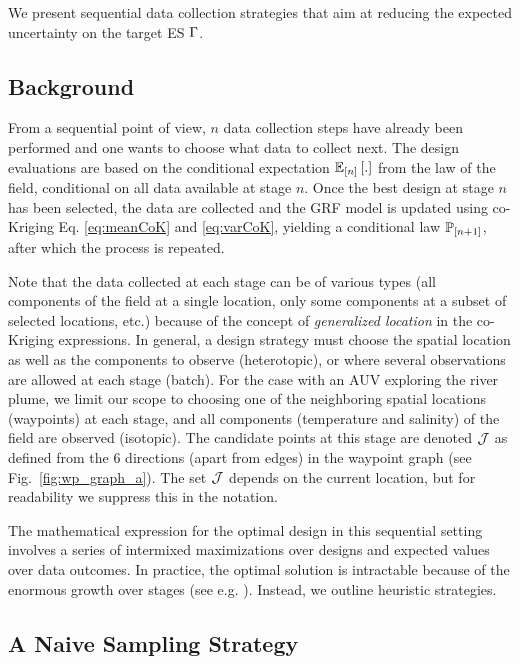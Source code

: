 \documentclass[aoas]{imsart}
\begin{document}
We present sequential data collection
strategies that aim at reducing the expected uncertainty on the target
ES $\Gamma$.

\subsection{Background}

From a sequential point of view, $n$ data collection steps have
already been performed and one wants to choose what data to collect
next. The design evaluations
are based on the conditional expectation $\mathbb{E}_{[n]} \left[.\right]$ from the law
of the field, conditional on all data available at
stage $n$.
Once the best design at stage $n$
has been selected, the data are collected and the GRF
model is updated using co-Kriging
Eq. \ref{eq:meanCoK} and \ref{eq:varCoK}, yielding a conditional law $\mathbb{P}_{[n+1]}$,
after which the process is repeated.

Note that the data collected at each stage can be of various
types (all components of the field at a single location, only some
components at a subset of selected locations, etc.) because of the
concept of \textit{generalized location} in the co-Kriging expressions.
In general, a design strategy must choose the spatial location as well
as the components to observe (heterotopic), or where several
observations are allowed at each stage (batch).  For the case with an
AUV exploring the river plume, we limit our scope to choosing one of
the neighboring spatial locations (waypoints) at each stage, and all
components (temperature and salinity) of the field are observed
(isotopic). The candidate points at this stage are denoted
$\mathcal{J}$ as defined from the 6 directions (apart from edges) in
the waypoint graph (see Fig.~\ref{fig:wp_graph_a}). The
set $\mathcal{J}$ depends on the current location, but for readability
we suppress this in the notation.

The mathematical expression for the optimal design in this sequential
setting involves a series of intermixed maximizations over designs and
expected values over data outcomes. In practice, the optimal solution is intractable
because of the enormous growth over stages (see
e.g. \cite{powell2016perspectives}).
Instead, we outline heuristic strategies.


\subsection{A Naive Sampling Strategy}
\label{naive}
\end{document}
